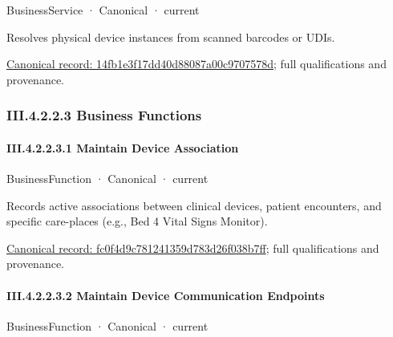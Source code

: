 \label{element:14fb1e3f17dd40d88087a00c9707578d}
{\small BusinessService · Canonical · current}\par

Resolves physical device instances from scanned barcodes or UDIs.


{\footnotesize \href{../../../../continuum/business/business-service/14fb1e3f17dd40d88087a00c9707578d.md}{Canonical record: 14fb1e3f17dd40d88087a00c9707578d}; full qualifications and provenance.}\par
\subsubsection*{III.4.2.2.3 Business Functions}
\label{navigation:III.4.2.2.3}

\paragraph*{III.4.2.2.3.1 Maintain Device Association}
\label{navigation:III.4.2.2.3.1}

\label{element:fc0f4d9c781241359d783d26f038b7ff}
{\small BusinessFunction · Canonical · current}\par

Records active associations between clinical devices, patient encounters, and specific care-places (e.g., Bed 4 Vital Signs Monitor).


{\footnotesize \href{../../../../continuum/business/business-function/fc0f4d9c781241359d783d26f038b7ff.md}{Canonical record: fc0f4d9c781241359d783d26f038b7ff}; full qualifications and provenance.}\par
\paragraph*{III.4.2.2.3.2 Maintain Device Communication Endpoints}
\label{navigation:III.4.2.2.3.2}

\label{element:ab5a7538fbd449ae8214d584b7d53a43}
{\small BusinessFunction · Canonical · current}\par

